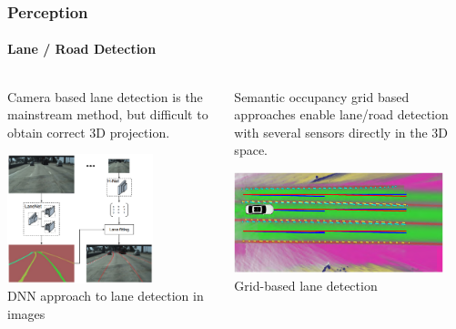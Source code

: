 {\begin{frame}
\frametitle{Perception}
\framesubtitle{Lane / Road Detection}
\begin{columns}[T]
    \begin{column}{0.5\textwidth}
        Camera based lane detection is the mainstream method, but difficult
        to obtain correct 3D projection.
        \begin{center}
        \includegraphics[width=0.7\textwidth]{images/lane_detection_vision.png}\\
        \footnotesize  DNN approach to lane detection in images \cite{Neven2018-om}
        \end{center}
    \end{column}
    \begin{column}{0.5\textwidth}
        Semantic occupancy grid based approaches enable lane/road detection
        with several sensors directly in the 3D space.
        \begin{center}
        \includegraphics[width=0.9\textwidth]{images/thomas_semantic_grids.png}\\
        \footnotesize Grid-based lane detection \cite{Thomas2021-mi}
        \end{center}
    \end{column}
\end{columns}
\end{frame}

}
